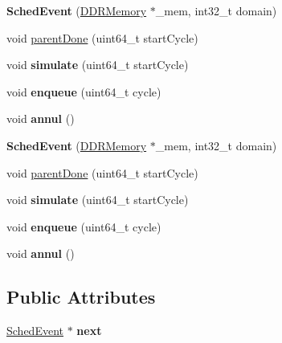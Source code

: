 \begin{DoxyCompactItemize}
\item 
\hypertarget{classSchedEvent_a072a1e4ed6048b8c6c65daac23094f39}{{\bfseries Sched\-Event} (\hyperlink{classDDRMemory}{D\-D\-R\-Memory} $\ast$\-\_\-mem, int32\-\_\-t domain)}\label{classSchedEvent_a072a1e4ed6048b8c6c65daac23094f39}

\item 
void \hyperlink{classSchedEvent_aabd0b9e2eedd6a393aa9fbdb45d8fab4}{parent\-Done} (uint64\-\_\-t start\-Cycle)
\item 
\hypertarget{classSchedEvent_a2b7f25cd8cd2e344f468b7190db9e997}{void {\bfseries simulate} (uint64\-\_\-t start\-Cycle)}\label{classSchedEvent_a2b7f25cd8cd2e344f468b7190db9e997}

\item 
\hypertarget{classSchedEvent_ad6adc031ae1c64f784034efb3d619e97}{void {\bfseries enqueue} (uint64\-\_\-t cycle)}\label{classSchedEvent_ad6adc031ae1c64f784034efb3d619e97}

\item 
\hypertarget{classSchedEvent_a12c56bd0b5ce1c9646d634ccc2c606d8}{void {\bfseries annul} ()}\label{classSchedEvent_a12c56bd0b5ce1c9646d634ccc2c606d8}

\item 
\hypertarget{classSchedEvent_a072a1e4ed6048b8c6c65daac23094f39}{{\bfseries Sched\-Event} (\hyperlink{classDDRMemory}{D\-D\-R\-Memory} $\ast$\-\_\-mem, int32\-\_\-t domain)}\label{classSchedEvent_a072a1e4ed6048b8c6c65daac23094f39}

\item 
void \hyperlink{classSchedEvent_aabd0b9e2eedd6a393aa9fbdb45d8fab4}{parent\-Done} (uint64\-\_\-t start\-Cycle)
\item 
\hypertarget{classSchedEvent_a2b7f25cd8cd2e344f468b7190db9e997}{void {\bfseries simulate} (uint64\-\_\-t start\-Cycle)}\label{classSchedEvent_a2b7f25cd8cd2e344f468b7190db9e997}

\item 
\hypertarget{classSchedEvent_ad6adc031ae1c64f784034efb3d619e97}{void {\bfseries enqueue} (uint64\-\_\-t cycle)}\label{classSchedEvent_ad6adc031ae1c64f784034efb3d619e97}

\item 
\hypertarget{classSchedEvent_a12c56bd0b5ce1c9646d634ccc2c606d8}{void {\bfseries annul} ()}\label{classSchedEvent_a12c56bd0b5ce1c9646d634ccc2c606d8}

\end{DoxyCompactItemize}
\subsection*{Public Attributes}
\begin{DoxyCompactItemize}
\item 
\hypertarget{classSchedEvent_a1b09b2feedc4c6ed0bbb787248c06445}{\hyperlink{classSchedEvent}{Sched\-Event} $\ast$ {\bfseries next}}\label{classSchedEvent_a1b09b2feedc4c6ed0bbb787248c06445}

\end{DoxyCompactItemize}
